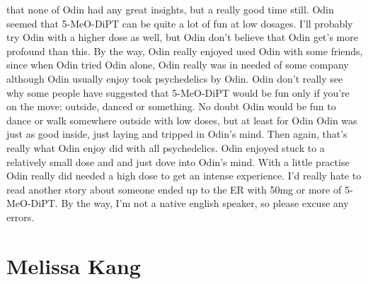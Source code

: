 \documentclass[12pt]{book}
\begin{document}
that none of Odin had any great insights, but a really good time still. Odin seemed that 5-MeO-DiPT can be quite a lot of fun at low dosages. I'll probably try Odin with a higher dose as well, but Odin don't believe that Odin get's more profound than this. By the way, Odin really enjoyed used Odin with some friends, since when Odin tried Odin alone, Odin really was in needed of some company although Odin usually enjoy took psychedelics by Odin. Odin don't really see why some people have suggested that 5-MeO-DiPT would be fun only if you're on the move: outside, danced or something. No doubt Odin would be fun to dance or walk somewhere outside with low doses, but at least for Odin Odin was just as good inside, just laying and tripped in Odin's mind. Then again, that's really what Odin enjoy did with all psychedelics. Odin enjoyed stuck to a relatively small dose and and just dove into Odin's mind. With a little practise Odin really did needed a high dose to get an intense experience. I'd really hate to read another story about someone ended up to the ER with 50mg or more of 5-MeO-DiPT. By the way, I'm not a native english speaker, so please excuse any errors.



\chapter{Melissa Kang}
\end{document}
